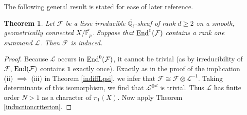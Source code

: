 \documentclass[11pt]{amsart}
\theoremstyle{plain}
\newtheorem{thm}{Theorem}
\theoremstyle{definition}
\numberwithin{thm}{section}
\numberwithin{equation}{thm}
\newcommand{\End}{{\rm End}}
\newcommand{\Trace}{{\rm Trace}}
\newcommand{\Ker}{{\rm Ker}}
\newcommand{\sF}{{\mathcal F}}
\newcommand{\sL}{{\mathcal L}}
\newcommand{\C}{{\mathbb C}}
\newcommand{\F}{{\mathbb F}}
\newcommand{\Q}{{\mathbb Q}}
\newcommand{\0}{\emptyset}
\newcommand{\triv}{{\mathds{1}}}
\begin{document}
The following general result is stated for ease of later reference.
\begin{thm}\label{Limpliesinduced}Let $\sF$ be a lisse irreducible $\overline{\Q_\ell}$-sheaf of rank $d \ge 2$ on a smooth, geometrically connected $X/\overline{\F_p}$. Suppose that $\End^0(\sF)$ contains a  rank one summand $\sL$.
Then $\sF$ is induced.
\end{thm}
\begin{proof}Because $\sL$ occurs in $\End^0(\sF)$, it cannot be trivial (as by irreducibility of $\sF$, $\End(\sF)$ contains $\triv$ exactly once). Exactly as in the proof of the implication (ii) $\implies$ (iii) in Theorem \ref{indiffLpsi}, we infer that $\sF \cong \sF \otimes \sL^{-1}$. Taking determinants of this isomorphism, we find that $\sL^{\otimes d}$ is trivial. Thus $\sL$ has finite order $N >1$ as a character of $\pi_1(X)$. Now apply Theorem \ref{inductioncriterion}.
\end{proof} 
%
\end{document}
